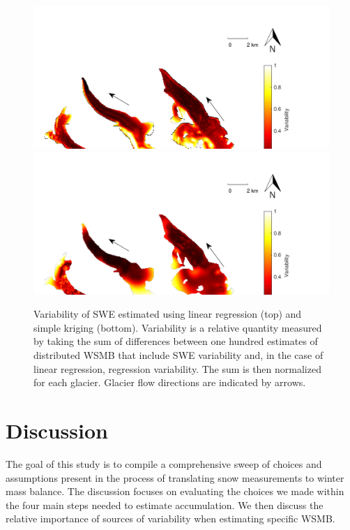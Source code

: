 \documentclass[review,oneside, letterpaper]{igs}
\begin{document}
\begin{figure}
	\centering
	\includegraphics[width =\textwidth]{SpatialVar_LR.pdf}\\
	\includegraphics[width =\textwidth]{SpatialVar_SK.pdf}\\
	\caption{Variability of SWE estimated using linear regression (top) and simple kriging (bottom).	Variability is a relative quantity measured by taking the sum of differences between one hundred estimates of distributed WSMB that include SWE variability and, in the case of linear regression, regression variability. The sum is then normalized for each glacier. Glacier flow directions are indicated by arrows.}
	\label{fig:WSMBspatialvar}
\end{figure}




\section{Discussion}

The goal of this study is to compile a comprehensive sweep of choices and assumptions present in the process of translating snow measurements to winter mass balance. The discussion focuses on evaluating the choices we made within the four main steps needed to estimate accumulation. We then discuss the relative importance of sources of variability when estimating specific WSMB.
\end{document}
